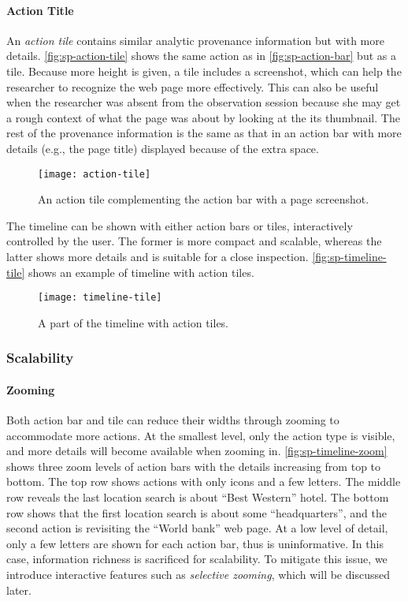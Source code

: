 \paragraph{Action Title}
An \emph{action tile} contains similar analytic provenance information but with more details. \autoref{fig:sp-action-tile} shows the same action as in \autoref{fig:sp-action-bar} but as a tile. Because more height is given, a tile includes a screenshot, which can help the researcher to recognize the web page more effectively. This can also be useful when the researcher was absent from the observation session because she may get a rough context of what the page was about by looking at the its thumbnail. The rest of the provenance information is the same as that in an action bar with more details (e.g., the page title) displayed because of the extra space.

\begin{figure}[!htb]
\centering
\texttt{[image: action-tile]}
\caption[An action tile]{An action tile complementing the action bar with a page screenshot.}
\label{fig:sp-action-tile}
\end{figure}

The timeline can be shown with either action bars or tiles, interactively controlled by the user. The former is more compact and scalable, whereas the latter shows more details and is suitable for a close inspection. \autoref{fig:sp-timeline-tile} shows an example of timeline with action tiles.

\begin{figure}[!htb]
\centering
\texttt{[image: timeline-tile]}
\caption{A part of the timeline with action tiles.}
\label{fig:sp-timeline-tile}
\end{figure}

\subsubsection{Scalability}
\paragraph{Zooming}
Both action bar and tile can reduce their widths through zooming to accommodate more actions. At the smallest level, only the action type is visible, and more details will become available when zooming in. \autoref{fig:sp-timeline-zoom} shows three zoom levels of action bars with the details increasing from top to bottom. The top row shows actions with only icons and a few letters. The middle row reveals the last location search is about ``Best Western'' hotel. The bottom row shows that the first location search is about some ``headquarters'', and the second action is revisiting the ``World bank'' web page. At a low level of detail, only a few letters are shown for each action bar, thus is uninformative. In this case, information richness is sacrificed for scalability. To mitigate this issue, we introduce interactive features such as \emph{selective zooming}, which will be discussed later.

